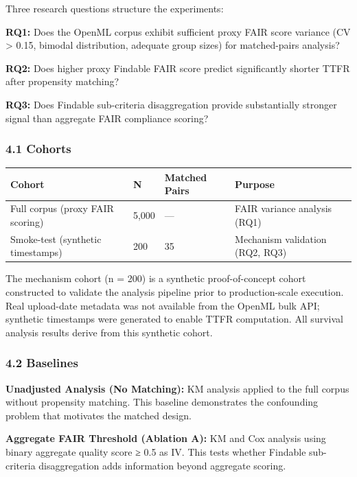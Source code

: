 
Three research questions structure the experiments:

\textbf{RQ1:} Does the OpenML corpus exhibit sufficient proxy FAIR score variance (CV > 0.15, bimodal distribution, adequate group sizes) for matched-pairs analysis?

\textbf{RQ2:} Does higher proxy Findable FAIR score predict significantly shorter TTFR after propensity matching?

\textbf{RQ3:} Does Findable sub-criteria disaggregation provide substantially stronger signal than aggregate FAIR compliance scoring?

\subsubsection{4.1 Cohorts}

\begin{table}[htbp]
\centering
\begin{tabular}{llll}
\toprule
Cohort & N & Matched Pairs & Purpose \\
\midrule
Full corpus (proxy FAIR scoring) & 5,000 & — & FAIR variance analysis (RQ1) \\
Smoke-test (synthetic timestamps) & 200 & 35 & Mechanism validation (RQ2, RQ3) \\
\bottomrule
\end{tabular}
\end{table}

The mechanism cohort (n = 200) is a synthetic proof-of-concept cohort constructed to validate the analysis pipeline prior to production-scale execution. Real upload-date metadata was not available from the OpenML bulk API; synthetic timestamps were generated to enable TTFR computation. All survival analysis results derive from this synthetic cohort.

\subsubsection{4.2 Baselines}

\textbf{Unadjusted Analysis (No Matching):} KM analysis applied to the full corpus without propensity matching. This baseline demonstrates the confounding problem that motivates the matched design.

\textbf{Aggregate FAIR Threshold (Ablation A):} KM and Cox analysis using binary aggregate quality score ≥ 0.5 as IV. This tests whether Findable sub-criteria disaggregation adds information beyond aggregate scoring.

